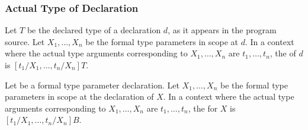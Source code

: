 \documentclass[makeidx]{article}
\begin{document}
{%


\subsubsection{Actual Type of Declaration}

%

\LMHash{}%
Let $T$ be the declared type of a declaration $d$,
as it appears in the program source.
Let $X_1, \ldots, X_n$ be the formal type parameters in scope at $d$.
In a context where the actual type arguments corresponding to
$X_1, \ldots, X_n$
are
$t_1, \ldots, t_n$,
the  of $d$ is
$[t_1/X_1, \ldots, t_n/X_n]T$.


\LMHash{}%
Let  be a formal type parameter declaration.
Let
$X_1, \ldots, X_n$
be the formal type parameters in scope at the declaration of $X$.
In a context where the actual type arguments corresponding to
$X_1, \ldots, X_n$
are
$t_1, \ldots, t_n$,
the  for $X$ is
$[t_1/X_1, \ldots, t_n/X_n]B$.

}
\end{document}

